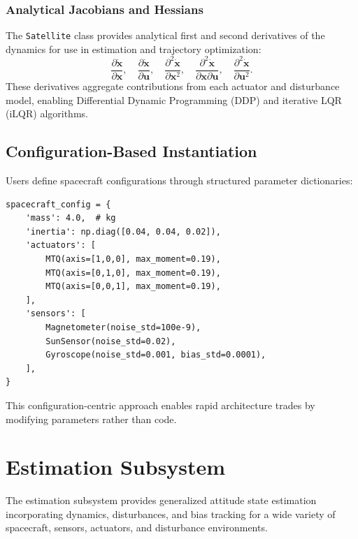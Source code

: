\documentclass[conference]{IEEEtran}
\begin{document}
\subsubsection{Analytical Jacobians and Hessians}
The \texttt{Satellite} class provides analytical first and second derivatives of the dynamics for use in estimation and trajectory optimization:
\begin{equation}
\frac{\partial \dot{\mathbf{x}}}{\partial \mathbf{x}}, \quad
\frac{\partial \dot{\mathbf{x}}}{\partial \mathbf{u}}, \quad
\frac{\partial^2 \dot{\mathbf{x}}}{\partial \mathbf{x}^2}, \quad
\frac{\partial^2 \dot{\mathbf{x}}}{\partial \mathbf{x} \partial \mathbf{u}}, \quad
\frac{\partial^2 \dot{\mathbf{x}}}{\partial \mathbf{u}^2}.
\end{equation}
These derivatives aggregate contributions from each actuator and disturbance model, enabling Differential Dynamic Programming (DDP) and iterative LQR (iLQR) algorithms.

\subsection{Configuration-Based Instantiation}\label{subsec:config}

Users define spacecraft configurations through structured parameter dictionaries:

\begin{lstlisting}[caption={Example spacecraft configuration}]
spacecraft_config = {
    'mass': 4.0,  # kg
    'inertia': np.diag([0.04, 0.04, 0.02]),
    'actuators': [
        MTQ(axis=[1,0,0], max_moment=0.19),
        MTQ(axis=[0,1,0], max_moment=0.19),
        MTQ(axis=[0,0,1], max_moment=0.19),
    ],
    'sensors': [
        Magnetometer(noise_std=100e-9),
        SunSensor(noise_std=0.02),
        Gyroscope(noise_std=0.001, bias_std=0.0001),
    ],
}
\end{lstlisting}

This configuration-centric approach enables rapid architecture trades by modifying parameters rather than code.


\section{Estimation Subsystem}\label{sec:estimation}

The estimation subsystem provides generalized attitude state estimation incorporating dynamics, disturbances, and bias tracking for a wide variety of spacecraft, sensors, actuators, and disturbance environments.
\end{document}
